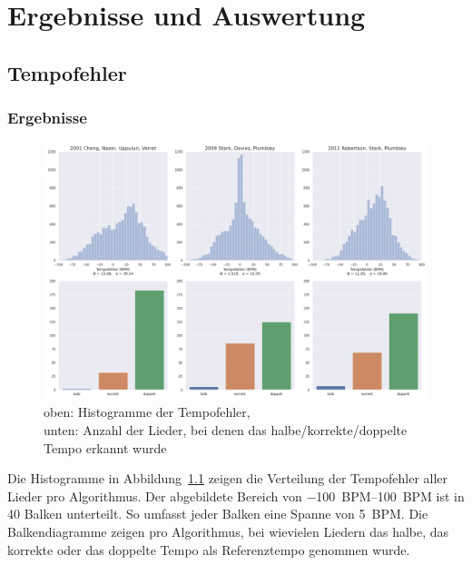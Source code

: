 \chapter{Ergebnisse und Auswertung}
\label{ergebnisse}


\section{Tempofehler}
{
	\subsection{Ergebnisse}
	{
		\begin{figure}[h]
			\hspace{-17mm}
			\includegraphics[scale=0.4]{resources/tempo_error_histogram.png}
			\caption{
				oben: Histogramme der Tempofehler, \\
				unten: Anzahl der Lieder, bei denen das halbe/korrekte/doppelte Tempo erkannt wurde
			}
			\label{fig:tempoerror}
		\end{figure}

		Die Histogramme in Abbildung~\ref{fig:tempoerror} zeigen die Verteilung der Tempofehler aller Lieder pro Algorithmus.
		Der abgebildete Bereich von \SIrange{-100}{100}{BPM} ist in \num{40} Balken unterteilt.
		So umfasst jeder Balken eine Spanne von \SI{5}{BPM}.
		Die Balkendiagramme zeigen pro Algorithmus,
			bei wievielen Liedern das halbe, das korrekte oder das doppelte Tempo als Referenztempo genommen wurde.

}}
